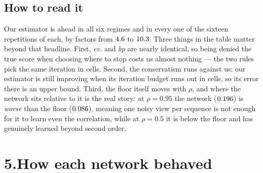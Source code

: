 \documentclass[10pt,a4paper]{article}
\newcommand{\corr}{\rho}
\newcommand{\nseq}{M}
\begin{document}
\begin{table}[H]
\centering\small
{\setlength{\tabcolsep}{4pt}}\label{tab:regimes}
\caption{16 seeds per cell, $\nseq=2048$. \textsc{lmmse} is the second-order floor for that regime.
\emph{EM--BP (ev.)} is our estimator stopped on held-out evidence, which is the honest rule;
\emph{(bp)} is the same estimator stopped by an oracle, shown so the cost of honesty is visible.
\emph{best net (C)} is the best network on one noisy view --- the matched comparison. \emph{best
net (B)} is the best network additionally given the \emph{clean} sequence, an easier problem
included to show what the restriction costs. The factor compares net (C) with EM--BP (ev.), paired
by seed, with a percentile bootstrap. $\dagger6$: in $6$ of the $16$ seeds of that cell the
network's held-out curve never improved on its first checkpoint --- reported, deliberately not
excluded.}
\label{tab:regimes}
\end{table}

\subsection{How to read it} Our estimator is ahead in all six regimes and in every one of the
sixteen repetitions of each, by factors from $4.6$ to
$10.3$. Three things in the table matter beyond that headline. First,
\emph{ev.} and \emph{bp} are nearly identical, so being denied the true score when choosing where
to stop costs us almost nothing --- the two rules pick the same iteration in
\rbEmAgreeRungTotal{} cells. Second, the conservatism runs against us: our estimator is still
improving when its iteration budget runs out in \rbEmEvAtCapTotal{} cells, so its error there is an
upper bound. Third, the floor itself moves with $\corr$, and where the network sits relative to it
is the real story: at $\corr=0.95$ the network ($0.196$) is \emph{worse} than the floor ($0.086$),
meaning one noisy view per sequence is not enough for it to learn even the correlation, while at
$\corr=0.5$ it is below the floor and has genuinely learned beyond second order.

\section*{5.\quad How each network behaved}


\end{document}
